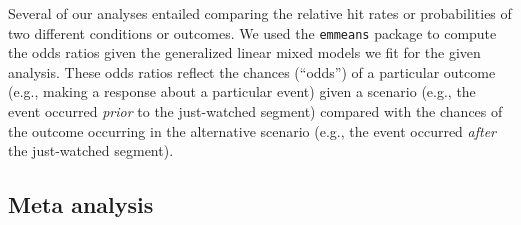 \documentclass[10pt]{article}
\begin{document}
Several of our analyses entailed comparing the relative hit rates or
probabilities of two different conditions or outcomes. We used the
\texttt{emmeans} package to compute the odds ratios given the generalized
linear mixed models we fit for the given analysis. These odds ratios reflect
the chances (``odds'') of a particular outcome (e.g., making a response about a
particular event) given a scenario (e.g., the event occurred \textit{prior} to
the just-watched segment) compared with the chances of the outcome occurring in
the alternative scenario (e.g., the event occurred \textit{after} the
just-watched segment).

\subsection*{Meta analysis}

\end{document}

